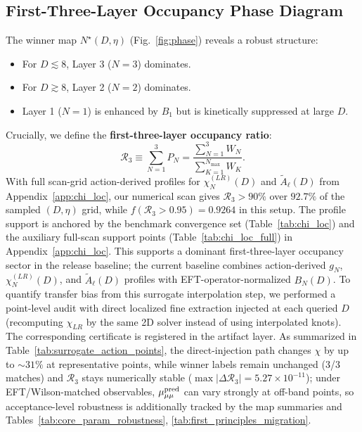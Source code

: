 \documentclass[aps,prd,onecolumn,notitlepage,nofootinbib,superscriptaddress,11pt,floatfix]{revtex4-2}
\begin{document}
\subsection{First-Three-Layer Occupancy Phase Diagram}
The winner map $N^\star(D, \eta)$ (Fig.~\ref{fig:phase}) reveals a robust structure:
\begin{itemize}
    \item For $D \lesssim 8$, Layer 3 ($N=3$) dominates.
    \item For $D \gtrsim 8$, Layer 2 ($N=2$) dominates.
    \item Layer 1 ($N=1$) is enhanced by $B_1$ but is kinetically suppressed at large $D$.
\end{itemize}
Crucially, we define the \textbf{first-three-layer occupancy ratio}:
\begin{equation}
\mathcal{R}_3 \equiv \sum_{N=1}^{3} P_N = \frac{\sum_{N=1}^{3} W_N}{\sum_{K=1}^{N_{\max}} W_K}.
\label{eq:R3}
\end{equation}
With full scan-grid action-derived profiles for $\chi_N^{(LR)}(D)$ and $\tilde A_\ell(D)$ from Appendix~\ref{app:chi_loc}, our numerical scan gives $\mathcal{R}_3 > 90\%$ over $92.7\%$ of the sampled $(D,\eta)$ grid, while $f(\mathcal{R}_3>0.95)=0.9264$ in this setup. The profile support is anchored by the benchmark convergence set (Table~\ref{tab:chi_loc}) and the auxiliary full-scan support points (Table~\ref{tab:chi_loc_full}) in Appendix~\ref{app:chi_loc}. This supports a dominant first-three-layer occupancy sector in the release baseline; the current baseline combines action-derived $g_N$, $\chi_N^{(LR)}(D)$, and $\tilde A_\ell(D)$ profiles with EFT-operator-normalized $B_N(D)$.
To quantify transfer bias from this surrogate interpolation step, we performed a point-level audit with direct localized fine extraction injected at each queried $D$ (recomputing $\chi_{LR}$ by the same 2D solver instead of using interpolated knots). The corresponding certificate is registered in the artifact layer. As summarized in Table~\ref{tab:surrogate_action_points}, the direct-injection path changes $\chi$ by up to $\sim31\%$ at representative points, while winner labels remain unchanged (3/3 matches) and $\mathcal{R}_3$ stays numerically stable ($\max|\Delta \mathcal{R}_3|=5.27\times10^{-11}$); under EFT/Wilson-matched observables, $\mu_{\mu\mu}^{\rm pred}$ can vary strongly at off-band points, so acceptance-level robustness is additionally tracked by the map summaries and Tables~\ref{tab:core_param_robustness}, \ref{tab:first_principles_migration}.
\end{document}
